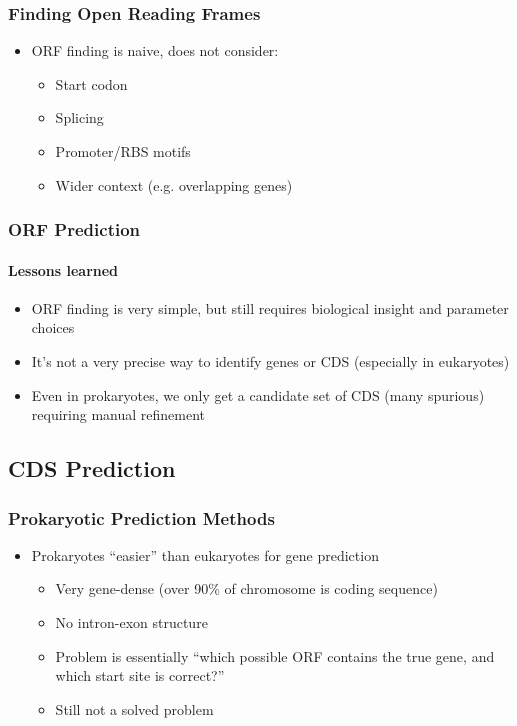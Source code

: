 \documentclass[table]{beamer}
\begin{document}
\begin{frame}
    \frametitle{Finding Open Reading Frames}
    \begin{itemize}
      \item<1-> ORF finding is naive, does not consider:
      \begin{itemize}
        \item Start codon
        \item Splicing
        \item Promoter/RBS motifs
        \item Wider context (e.g. overlapping genes)
      \end{itemize}
    \end{itemize}
\end{frame}

    \begin{frame}
      \frametitle{ORF Prediction}   
      \framesubtitle{Lessons learned}   
      \begin{itemize}
        \item ORF finding is very simple, but still requires biological insight and parameter choices
        \item It's not a very precise way to identify genes or CDS (especially in eukaryotes)
        \item Even in prokaryotes, we only get a candidate set of CDS (many spurious) requiring manual refinement
      \end{itemize}
    \end{frame}

    \subsection{CDS Prediction}
    \begin{frame}
     \frametitle{Prokaryotic Prediction Methods}
     \begin{itemize}
       \item Prokaryotes ``easier'' than eukaryotes for gene prediction
       \begin{itemize}
         \item Very gene-dense (over 90\% of chromosome is coding sequence)
         \item No intron-exon structure
         \item Problem is essentially ``which possible ORF contains the true gene, and which start site is correct?''
         \item Still not a solved problem
       \end{itemize}       
     \end{itemize}
    \end{frame}
\end{document}
